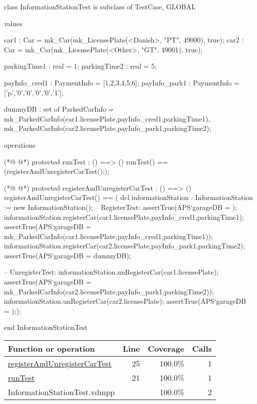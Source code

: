 \begin{vdmpp}[breaklines=true]
class InformationStationTest is subclass of TestCase, GLOBAL


values

car1 : Car = mk_Car(mk_LicensePlate(<Danish>, "PT", 49000), true);
car2 : Car = mk_Car(mk_LicensePlate(<Other>, "GT", 49001), true); 


parkingTime1 : real = 1;
parkingTime2 : real = 5;

payInfo_cred1 : PaymentInfo = [1,2,3,4,5,6];
payInfo_park1 : PaymentInfo = ['p','0','0','0','0','1'];

dummyDB : set of ParkedCarInfo = {mk_ParkedCarInfo(car1.licensePlate,payInfo_cred1,parkingTime1), 
                 mk_ParkedCarInfo(car2.licensePlate,payInfo_park1,parkingTime2)};

operations 

(*@
\label{runTest:21}
@*)
protected runTest : () ==> ()
runTest() == 
 (registerAndUnregisterCarTest(););
 
(*@
\label{registerAndUnregisterCarTest:25}
@*)
protected registerAndUnregisterCarTest : () ==> ()
registerAndUnregisterCarTest() == (
 dcl informationStation : InformationStation := new InformationStation();
 -- RegisterTest:
 assertTrue(APS`garageDB = {});
 informationStation.registerCar(car1.licensePlate,payInfo_cred1,parkingTime1);
 assertTrue(APS`garageDB = {mk_ParkedCarInfo(car1.licensePlate,payInfo_cred1,parkingTime1)});
 informationStation.registerCar(car2.licensePlate,payInfo_park1,parkingTime2);
 assertTrue(APS`garageDB = dummyDB);
 
 -- UnregisterTest:
 informationStation.unRegisterCar(car1.licensePlate);
 assertTrue(APS`garageDB = {mk_ParkedCarInfo(car2.licensePlate,payInfo_park1,parkingTime2)});
 informationStation.unRegisterCar(car2.licensePlate);
 assertTrue(APS`garageDB = {}););


end InformationStationTest
\end{vdmpp}
\bigskip
\begin{longtable}{|l|r|r|r|}
\hline
Function or operation & Line & Coverage & Calls \\
\hline
\hline
\hyperref[registerAndUnregisterCarTest:25]{registerAndUnregisterCarTest} & 25&100.0\% & 1 \\
\hline
\hyperref[runTest:21]{runTest} & 21&100.0\% & 1 \\
\hline
\hline
InformationStationTest.vdmpp & & 100.0\% & 2 \\
\hline
\end{longtable}

